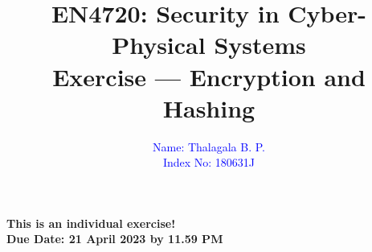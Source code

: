 \documentclass[11pt,letterpaper]{article}
\begin{document}
	
	\title{EN4720: Security in Cyber-Physical Systems \\ Exercise --- Encryption and Hashing}
	
	\author{ \textcolor{blue}{Name: Thalagala B. P.} \\ \textcolor{blue}{Index No: 180631J}}
	
	\maketitle
	
	\begin{center}
		\color{red}\bf This is an individual exercise! \\ Due Date: 21 April 2023 by 11.59 PM
	\end{center}
	
	
	
	
			
			
\end{document}

